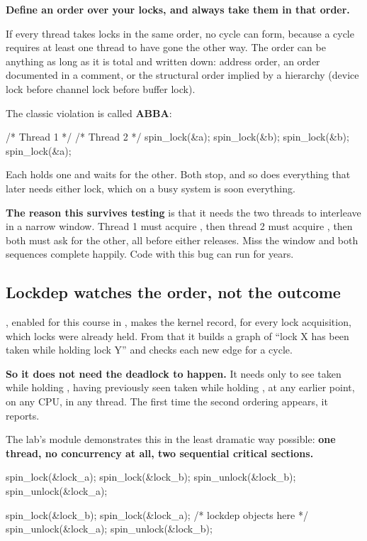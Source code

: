 \textbf{Define an order over your locks, and always take them in that order.}

If every thread takes locks in the same order, no cycle can form, because a cycle requires at least
one thread to have gone the other way. The order can be anything as long as it is total and written
down: address order, an order documented in a comment, or the structural order implied by a
hierarchy (device lock before channel lock before buffer lock).

The classic violation is called \textbf{ABBA}:

\begin{ccode}
/* Thread 1 */                    /* Thread 2 */
spin_lock(&a);                    spin_lock(&b);
spin_lock(&b);                    spin_lock(&a);
\end{ccode}

\noindent Each holds one and waits for the other. Both stop, and so does everything that later needs
either lock, which on a busy system is soon everything.

\textbf{The reason this survives testing} is that it needs the two threads to interleave in a narrow
window. Thread 1 must acquire , then thread 2 must acquire , then both must ask for
the other, all before either releases. Miss the window and both sequences complete happily. Code
with this bug can run for years.

\subsection{Lockdep watches the order, not the outcome}
\label{c7:app:b3}

, enabled for this course in , makes the kernel
record, for every lock acquisition, which locks were already held. From that it builds a graph of
``lock X has been taken while holding lock Y'' and checks each new edge for a cycle.

\textbf{So it does not need the deadlock to happen.} It needs only to see  taken while
holding , having previously seen  taken while holding , at any earlier
point, on any CPU, in any thread. The first time the second ordering appears, it reports.

The lab's  module demonstrates this in the least dramatic way possible: \textbf{one
thread, no concurrency at all, two sequential critical sections.}

\begin{ccode}
spin_lock(&lock_a);
spin_lock(&lock_b);
spin_unlock(&lock_b);
spin_unlock(&lock_a);

spin_lock(&lock_b);
spin_lock(&lock_a);          /* lockdep objects here */
spin_unlock(&lock_a);
spin_unlock(&lock_b);
\end{ccode}


